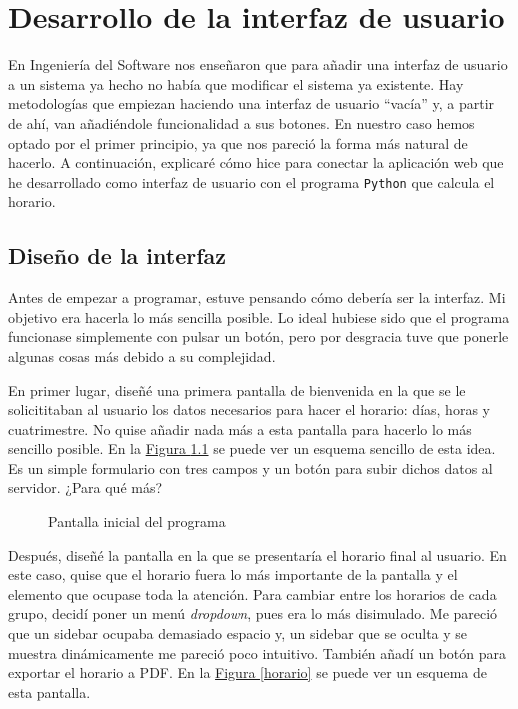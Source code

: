 \chapter{Desarrollo de la interfaz de usuario}
En Ingeniería del Software nos enseñaron que para añadir una interfaz de usuario a un sistema ya hecho no había que modificar el sistema ya existente. Hay metodologías que empiezan haciendo una interfaz de usuario ``vacía'' y, a partir de ahí, van añadiéndole funcionalidad a sus botones. En nuestro caso hemos optado por el primer principio, ya que nos pareció la forma más natural de hacerlo. A continuación, explicaré cómo hice para conectar la aplicación web que he desarrollado como interfaz de usuario con el programa \texttt{Python} que calcula el horario.

\section{Diseño de la interfaz}
Antes de empezar a programar, estuve pensando cómo debería ser la interfaz. Mi objetivo era hacerla lo más sencilla posible. Lo ideal hubiese sido que el programa funcionase simplemente con pulsar un botón, pero por desgracia tuve que ponerle algunas cosas más debido a su complejidad.

En primer lugar, diseñé una primera pantalla de bienvenida en la que se le solicititaban al usuario los datos necesarios para hacer el horario: días, horas y cuatrimestre. No quise añadir nada más a esta pantalla para hacerlo lo más sencillo posible. En la \hyperref[init]{Figura \ref*{init}} se puede ver un esquema sencillo de esta idea. Es un simple formulario con tres campos y un botón para subir dichos datos al servidor. ¿Para qué más?

\begin{figure}
\centering
\scalebox{.7}{}
\caption{Pantalla inicial del programa}
\label{init}
\end{figure}

Después, diseñé la pantalla en la que se presentaría el horario final al usuario. En este caso, quise que el horario fuera lo más importante de la pantalla y el elemento que ocupase toda la atención. Para cambiar entre los horarios de cada grupo, decidí poner un menú \textit{dropdown}, pues era lo más disimulado. Me pareció que un sidebar ocupaba demasiado espacio y, un sidebar que se oculta y se muestra dinámicamente me pareció poco intuitivo. También añadí un botón para exportar el horario a PDF. En la \hyperref[horario]{Figura \ref*{horario}} se puede ver un esquema de esta pantalla.

